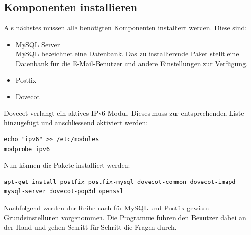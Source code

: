 

\subsection{Komponenten installieren}
Als nächstes müssen alle benötigten Komponenten installiert werden.
Diese sind:
\begin{itemize}
\item MySQL Server \\
MySQL bezeichnet eine Datenbank. Das zu installierende Paket stellt eine Datenbank für die E-Mail-Benutzer und andere Einstellungen zur Verfügung.

\item Postfix \\

\item Dovecot \\

\end{itemize}

Dovecot verlangt ein aktives IPv6-Modul. Dieses muss zur entsprechenden Liste hinzugefügt und anschliessend aktiviert werden:

\begin{lstlisting}
echo "ipv6" >> /etc/modules
modprobe ipv6
\end{lstlisting}

Nun können die Pakete installiert werden:

\begin{lstlisting}
apt-get install postfix postfix-mysql dovecot-common dovecot-imapd mysql-server dovecot-pop3d openssl
\end{lstlisting}

Nachfolgend werden der Reihe nach für MySQL und Postfix gewisse Grundeinstellunen vorgenommen. Die Programme führen den Benutzer dabei an der Hand und gehen Schritt für Schritt die Fragen durch.

